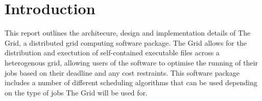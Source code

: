 \chapter{Introduction}
This report outlines the architecure, design and implementation details of The Grid, a distributed grid computing software package. The Grid allows for the distribution and exectution of self-contained executable files across a heterogenous grid, allowing users of the software to optimise the running of their jobs based on their deadline and any cost restraints. This software package includes a number of different scheduling algorithms that can be used depending on the type of jobs The Grid will be used for.
